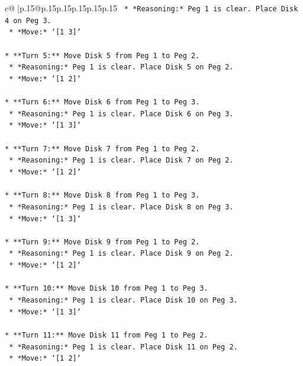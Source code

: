 \documentclass{article}
\begin{document}
{\begin{supertabular}{c@{$\;$}|p{.15\linewidth}@{}p{.15\linewidth}p{.15\linewidth}p{.15\linewidth}p{.15\linewidth}p{.15\linewidth}}
{{{\texttt{    *   *Reasoning:* Peg 1 is clear. Place Disk 4 on Peg 3.} \\
\texttt{    *   *Move:* `{[}1 3{]}`} \\
\\ 
\texttt{*   **Turn 5:** Move Disk 5 from Peg 1 to Peg 2.} \\
\texttt{    *   *Reasoning:* Peg 1 is clear. Place Disk 5 on Peg 2.} \\
\texttt{    *   *Move:* `{[}1 2{]}`} \\
\\ 
\texttt{*   **Turn 6:** Move Disk 6 from Peg 1 to Peg 3.} \\
\texttt{    *   *Reasoning:* Peg 1 is clear. Place Disk 6 on Peg 3.} \\
\texttt{    *   *Move:* `{[}1 3{]}`} \\
\\ 
\texttt{*   **Turn 7:** Move Disk 7 from Peg 1 to Peg 2.} \\
\texttt{    *   *Reasoning:* Peg 1 is clear. Place Disk 7 on Peg 2.} \\
\texttt{    *   *Move:* `{[}1 2{]}`} \\
\\ 
\texttt{*   **Turn 8:** Move Disk 8 from Peg 1 to Peg 3.} \\
\texttt{    *   *Reasoning:* Peg 1 is clear. Place Disk 8 on Peg 3.} \\
\texttt{    *   *Move:* `{[}1 3{]}`} \\
\\ 
\texttt{*   **Turn 9:** Move Disk 9 from Peg 1 to Peg 2.} \\
\texttt{    *   *Reasoning:* Peg 1 is clear. Place Disk 9 on Peg 2.} \\
\texttt{    *   *Move:* `{[}1 2{]}`} \\
\\ 
\texttt{*   **Turn 10:** Move Disk 10 from Peg 1 to Peg 3.} \\
\texttt{    *   *Reasoning:* Peg 1 is clear. Place Disk 10 on Peg 3.} \\
\texttt{    *   *Move:* `{[}1 3{]}`} \\
\\ 
\texttt{*   **Turn 11:** Move Disk 11 from Peg 1 to Peg 2.} \\
\texttt{    *   *Reasoning:* Peg 1 is clear. Place Disk 11 on Peg 2.} \\
\texttt{    *   *Move:* `{[}1 2{]}`} \\
\\ 
}}}
\end{supertabular}}
\end{document}
